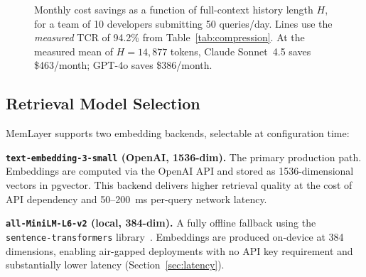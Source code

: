 \documentclass[10pt,twocolumn]{article}
\begin{document}
\begin{figure}[t]
\centering
{}
\caption{Monthly cost savings as a function of full-context history length
$H$, for a team of 10 developers submitting 50 queries/day.
Lines use the \emph{measured} TCR of 94.2\% from Table~\ref{tab:compression}.
At the measured mean of $H{=}14{,}877$ tokens, Claude Sonnet~4.5 saves
\$463/month; GPT-4o saves \$386/month.}
\label{fig:tcr_comparison}
\end{figure}

\subsection{Retrieval Model Selection}
\label{sec:weight_rationale}

\noindent
MemLayer supports two embedding backends, selectable at configuration time:

\textbf{\texttt{text-embedding-3-small} (OpenAI, 1536-dim).} The primary
production path. Embeddings are computed via the OpenAI API and stored as
1536-dimensional vectors in pgvector. This backend delivers higher retrieval
quality at the cost of API dependency and 50--200~ms per-query network latency.

\textbf{\texttt{all-MiniLM-L6-v2} (local, 384-dim).} A fully offline fallback
using the \texttt{sentence-transformers} library~\citep{reimers2019sentence}.
Embeddings are produced on-device at 384 dimensions, enabling air-gapped
deployments with no API key requirement and substantially lower latency
(Section~\ref{sec:latency}).
\end{document}
